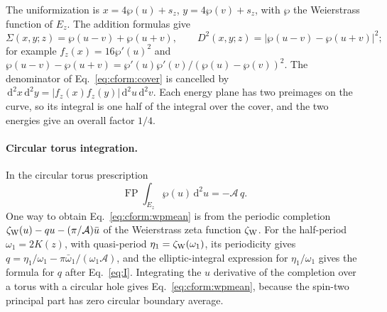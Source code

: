 \documentclass[11pt,a4paper]{article}
\numberwithin{equation}{section}
\newcommand{\dd}{\,\mathrm d}
\newcommand{\FP}{\operatorname{FP}}
\begin{document}
The uniformization is $x=4\wp(u)+s_z$, $y=4\wp(v)+s_z$, with $\wp$ the Weierstrass function of $E_z$. The addition
formulas give
\begin{equation}
 \Sigma(x,y;z)=\wp(u-v)+\wp(u+v),\qquad D^2(x,y;z)=|\wp(u-v)-\wp(u+v)|^2;
 \label{eq:cform:addition}
\end{equation}
for example $f_z(x)=16\wp'(u)^2$ and $\wp(u-v)-\wp(u+v)=\wp'(u)\wp'(v)/(\wp(u)-\wp(v))^2$. The denominator of
Eq.~\eqref{eq:cform:cover} is cancelled by $\dd^2x\dd^2y=|f_z(x)f_z(y)|\dd^2u\dd^2v$. Each energy plane has two
preimages on the curve, so its integral is one half of the integral over the cover, and the two energies give an
overall factor $1/4$.

\paragraph{Circular torus integration.} In the circular torus prescription
\begin{equation}
 \FP\!\int_{E_z}\wp(u)\dd^2u=-\mathcal A\,q.
 \label{eq:cform:wpmean}
\end{equation}
One way to obtain Eq.~\eqref{eq:cform:wpmean} is from the periodic completion
$\zeta_{\rm W}(u)-qu-(\pi/\mathcal A)\bar u$ of the Weierstrass zeta function $\zeta_{\rm W}$. For the half-period
$\omega_1=2K(z)$, with quasi-period $\eta_1=\zeta_{\rm W}(\omega_1)$, its periodicity gives
$q=\eta_1/\omega_1-\pi\bar\omega_1/(\omega_1\mathcal A)$, and the elliptic-integral expression for $\eta_1/\omega_1$
gives the formula for $q$ after Eq.~\eqref{eq:I}. Integrating the $u$ derivative of the completion over a torus with a
circular hole gives Eq.~\eqref{eq:cform:wpmean}, because the spin-two principal part has zero circular boundary
average.
\end{document}
